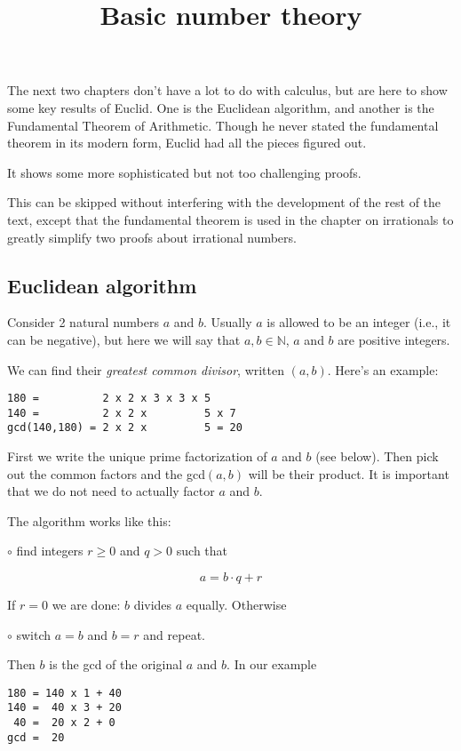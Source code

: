 \documentclass[11pt, oneside]{article}
\title{Basic number theory}
\date{}
\begin{document}
\maketitle
\Large

The next two chapters don't have a lot to do with calculus, but are here to show some key results of Euclid.  One is the Euclidean algorithm, and another is the Fundamental Theorem of Arithmetic.  Though he never stated the fundamental theorem in its modern form, Euclid had all the pieces figured out.  

It shows some more sophisticated but not too challenging proofs.  

This can be skipped without interfering with the development of the rest of the text, except that the fundamental theorem is used in the chapter on irrationals to greatly simplify two proofs about irrational numbers.

\subsection*{Euclidean algorithm}
Consider 2 natural numbers $a$ and $b$.  Usually $a$ is allowed to be an integer (i.e., it can be negative), but here we will say that $a,b \in \mathbb{N}$, $a$ and $b$ are positive integers.

We can find their \emph{greatest common divisor}, written $(a,b)$.  Here's an example:

\begin{verbatim}
180 =          2 x 2 x 3 x 3 x 5
140 =          2 x 2 x         5 x 7
gcd(140,180) = 2 x 2 x         5 = 20
\end{verbatim}

First we write the unique prime factorization of $a$ and $b$ (see below).  Then pick out the common factors and the gcd$(a,b)$ will be their product.  It is important that we do not need to actually factor $a$ and $b$.

The algorithm works like this:

$\circ$ find integers $r \ge 0$ and $q > 0$ such that

\[ a = b \cdot q + r \]

If $r = 0$ we are done:  $b$ divides $a$ equally.  Otherwise

$ \circ$ switch $a = b$ and $b = r$ and repeat.

Then $b$ is the gcd of the original $a$ and $b$.  In our example

\begin{verbatim}
180 = 140 x 1 + 40
140 =  40 x 3 + 20
 40 =  20 x 2 + 0
gcd =  20
\end{verbatim}
\end{document}
